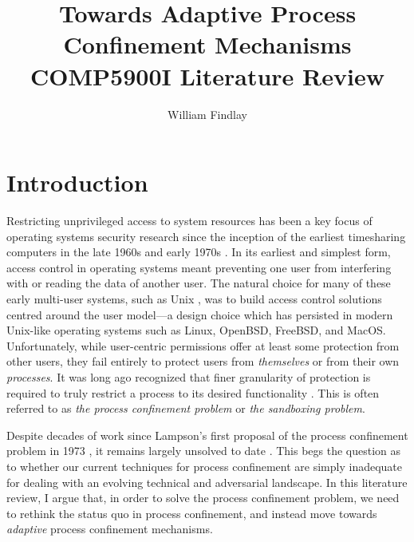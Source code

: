 \documentclass[dvipsnames, 12pt]{article}
\title{\huge Towards Adaptive Process Confinement
Mechanisms\\{\large COMP5900I Literature Review}}
\author{William Findlay}
\begin{document}
\maketitle
\thispagestyle{empty}


\vfill
\begin{abstract}
\end{abstract}
\vfill
\vfill

\clearpage

\setcounter{page}{1}


\section{Introduction}
\label{sec:introduction}

Restricting unprivileged access to system resources has been a key focus of
operating systems security research since the inception of the earliest
timesharing computers in the late 1960s and early 1970s
\cite{graham1968_protection, ritchie1973_unix, corbato1962_ctss}. In its
earliest and simplest form, access control in operating systems meant preventing
one user from interfering with or reading the data of another user. The natural
choice for many of these early multi-user systems, such as Unix
\cite{ritchie1973_unix}, was to build access control solutions centred around
the user model---a design choice which has persisted in modern Unix-like
operating systems such as Linux, OpenBSD, FreeBSD, and MacOS.  Unfortunately,
while user-centric permissions offer at least some protection from other users,
they fail entirely to protect users from \textit{themselves} or from their own
\textit{processes}.  It was long ago recognized that finer granularity of
protection is required to truly restrict a process to its desired functionality
\cite{lampson1973_a_note}. This is often referred to as \textit{the process
confinement problem} or \textit{the sandboxing problem}.

Despite decades of work since Lampson's first proposal of the process
confinement problem in 1973 \cite{lampson1973_a_note}, it remains largely
unsolved to date \cite{crowell2013_confinement_problem}. This begs the question
as to whether our current techniques for process confinement are simply
inadequate for dealing with an evolving technical and adversarial landscape.  In
this literature review, I argue that, in order to solve the process confinement
problem, we need to rethink the status quo in process confinement, and instead
move towards \textit{adaptive} process confinement mechanisms.
\end{document}
